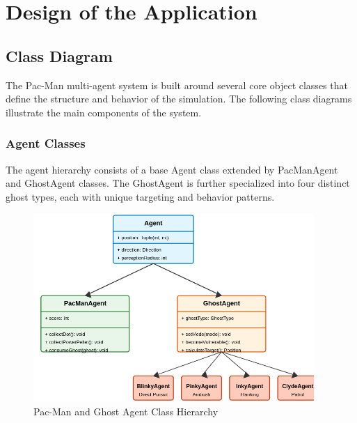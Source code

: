 \documentclass[a4paper, 11pt]{article}
\begin{document}
\clearpage

\section{Design of the Application}

\subsection{Class Diagram}
The Pac-Man multi-agent system is built around several core object classes that define the structure and behavior of the simulation. The following class diagrams illustrate the main components of the system.

\subsubsection{Agent Classes}
The agent hierarchy consists of a base Agent class extended by PacManAgent and GhostAgent classes. The GhostAgent is further specialized into four distinct ghost types, each with unique targeting and behavior patterns.

\begin{figure}[h]
\centering
\includegraphics[width=0.95\textwidth]{agent-class-diagram.png}
\caption{Pac-Man and Ghost Agent Class Hierarchy}
\end{figure}
\end{document}
